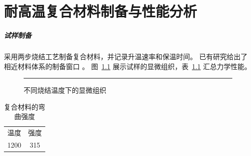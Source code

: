 \documentclass{book}
\begin{document}
\chapter{耐高温复合材料制备与性能分析}
\paragraph{试样制备}采用两步烧结工艺制备复合材料，并记录升温速率和保温时间。
已有研究给出了相近材料体系的制备窗口 \citep{li2024ceramic}。
图~\ref{fig:microstructure} 展示试样的显微组织，表~\ref{tab:strength} 汇总力学性能。
\begin{figure}[htbp]
  \centering
  \rule{4cm}{2cm}
  \caption{不同烧结温度下的显微组织}
  \label{fig:microstructure}
\end{figure}
\begin{table}[htbp]
  \centering
  \caption{复合材料的弯曲强度}
  \label{tab:strength}
  \begin{tabular}{cc}
  温度 & 强度 \\
  1200 & 315 \\
  \end{tabular}
\end{table}

\end{document}

